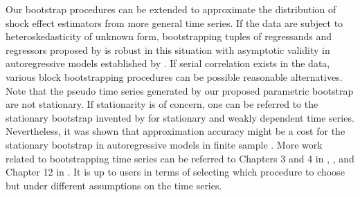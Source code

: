 \documentclass[11pt]{article}
\theoremstyle{definition}
\begin{document}
Our bootstrap procedures can be extended to approximate the distribution of shock effect estimators from more general time series. If the data are subject to heteroskedasticity of unknown form, bootstrapping tuples of regressands and regressors proposed by \citet{freedman1981bootstrapping} is robust in this situation with asymptotic validity in autoregressive models established by \citet{gonccalves2004bootstrapping}. If serial correlation exists in the data, various block bootstrapping procedures \citep{kunsch1989jackknife, liu1992moving} can be possible reasonable alternatives. Note that the pseudo time series generated by our proposed parametric bootstrap are not stationary. If stationarity is of concern, one can be referred to the stationary bootstrap invented by \citet{politis1994stationary} for stationary and weakly dependent time series. Nevertheless, it was shown that approximation accuracy might be a cost for the stationary bootstrap in autoregressive  models in finite sample \citep{berkowitz1999finite}.  More work related to bootstrapping time series  can be referred to Chapters 3 and 4 in \citet{politis1999subsampling}, \citet{berkowitz2000recent}, and Chapter 12 in \citet{kilian2017structural}. It is up to  users in terms of selecting which procedure to choose but under different assumptions on the time series.

\end{document}
